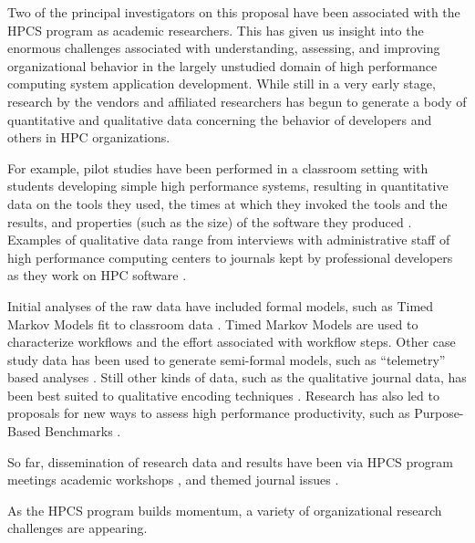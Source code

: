 
Two of the principal investigators on this proposal have been associated
with the HPCS program as academic researchers. This has given us insight
into the enormous challenges associated with understanding, assessing, and
improving organizational behavior in the largely unstudied domain of high
performance computing system application development.  While still in a
very early stage, research by the vendors and affiliated researchers has
begun to generate a body of quantitative and qualitative data
concerning the behavior of developers and others in HPC organizations.

For example, pilot studies have been performed in a classroom setting with
students developing simple high performance systems, resulting in
quantitative data on the tools they used, the times at which they
invoked the tools and the results, and properties (such as the size) of the
software they produced \cite{Funk05}. Examples of qualitative data range from interviews
with administrative staff of high performance computing centers to journals
kept by professional developers as they work on HPC software \cite{Votta05}.

Initial analyses of the raw data have included formal models, such as Timed
Markov Models fit to classroom data \cite{Smith05}. Timed Markov Models are
used to characterize workflows and the effort associated with workflow
steps.  Other case study data has been used to generate semi-formal models,
such as ``telemetry'' based analyses \cite{csdl2-04-11}.  Still other kinds
of data, such as the qualitative journal data, has been best suited to
qualitative encoding techniques \cite{Votta05}.  Research has also led to
proposals for new ways to assess high performance productivity, such as
Purpose-Based Benchmarks \cite{Gustafson04}.

So far, dissemination of research data and results have been via HPCS program
meetings \cite{hpcs-meeting} academic workshops \cite{pphec05,sehpcs05}, and 
themed journal issues \cite{ijhpca04}.

As the HPCS program builds momentum, a variety of organizational research
challenges are appearing.

